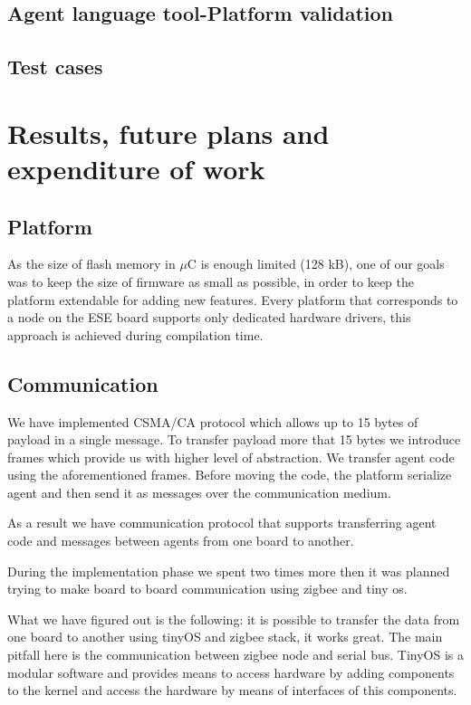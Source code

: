 \documentclass{scrreprt}
\begin{document}
\section{Agent language tool-Platform validation}

\section{Test cases}


\chapter{Results, future plans and expenditure of work}

\section{Platform}

As the size of flash memory in $\mu$C is enough limited (128 kB),
one of our goals was to keep the size of firmware as small as possible,
in order to keep the platform extendable for adding new features.
Every platform that corresponds to a node on the ESE board supports only 
dedicated hardware drivers, this approach is achieved during compilation time.








\section{Communication}

We have implemented CSMA/CA protocol which allows up to 15 bytes of payload
in a single message.
To transfer payload more that 15 bytes we introduce frames which
provide us with higher level of abstraction.
We transfer agent code using the aforementioned frames.
Before moving the code, the platform serialize agent and then send it as
messages over the communication medium.

As a result we have communication protocol that supports transferring 
agent code and messages between agents from one board to another.

During the implementation phase we spent two times more then it was planned 
trying to make board to board communication using zigbee and tiny os.


What we have figured out is the following: it is possible to transfer the data
from one board to another using tinyOS and zigbee stack, it works great. 
The main pitfall here is the communication between zigbee node and serial bus.
TinyOS is a modular software and provides means to access hardware by adding 
components to the kernel and access the hardware by means of interfaces of this components.
\end{document}
